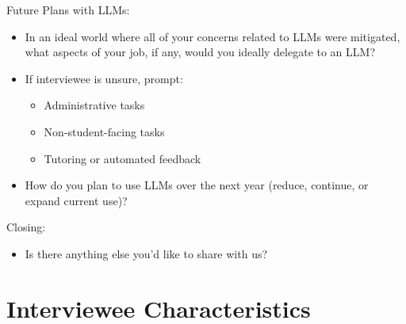 Future Plans with LLMs: 
\begin{itemize}
    \item In an ideal world where all of your concerns related to LLMs were mitigated, what aspects of your job, if any, would you ideally delegate to an LLM?
    \item If interviewee is unsure, prompt: 
    \begin{itemize}
        \item Administrative tasks
        \item Non-student-facing tasks
        \item Tutoring or automated feedback
    \end{itemize}
    \item How do you plan to use LLMs over the next year (reduce, continue, or expand current use)?
\end{itemize}

Closing:
\begin{itemize}
    \item Is there anything else you’d like to share with us?
\end{itemize}


\section{Interviewee Characteristics}\label{a-interviewee-characteristics}


